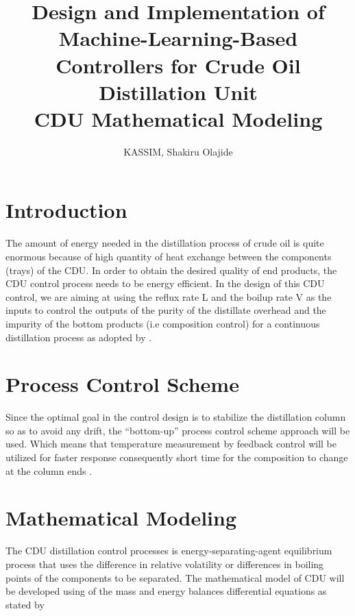 \documentclass[11pt,a4paper,oneside]{article}
\begin{document}
\title{Design and Implementation of Machine-Learning-Based Controllers for Crude
  Oil Distillation Unit\\
  
  CDU Mathematical Modeling
 }
  

\author{KASSIM, Shakiru Olajide}

\maketitle

\newpage
{}

\section {Introduction}
The amount of energy needed in the distillation process of crude oil is quite enormous because of high quantity of heat exchange between the components (trays) of the CDU. In order to obtain the desired quality of end products, the CDU control process needs to be energy efficient. In the design of this CDU control, we are aiming at using the reflux rate L and the boilup rate V as the inputs to control the outputs of the purity of the distillate overhead and the impurity of the bottom products (i.e composition control) for a continuous distillation process as adopted by \cite{Anish:37, Minh:38, Jay:40, Yun:44}.

\section {Process Control Scheme}
Since the optimal goal in the control design is to stabilize the distillation column so as to avoid any drift, the “bottom-up” process control scheme approach will be used. Which means that temperature measurement by feedback control will be utilized for faster response consequently short time for the composition to change at the column ends \cite{Satyajit:25}.

\section{Mathematical Modeling}
The CDU distillation control processes is energy-separating-agent equilibrium process that uses the difference in relative volatility or differences in boiling points of the components to be separated. The mathematical model of CDU will be developed using of the mass and energy balances differential equations as stated by \cite{Duraid:31, Duraid:32,Suresh:36,Anish:37}
\end{document}
